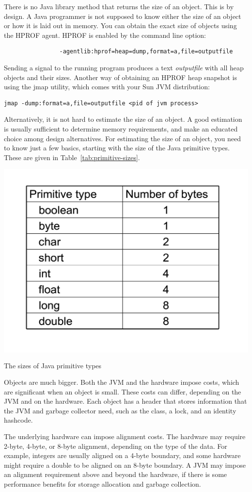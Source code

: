 \documentclass{book}
\theoremstyle{definition}
\begin{document}
There is no Java library method that returns the size of an object. This is by design. A Java programmer is not supposed to know either the size of an object or how it is laid out in memory.
You can obtain the exact size of objects using the HPROF agent. HPROF is enabled by the command line option: 
\ttfamily
\begin{verbatim} 
  				-agentlib:hprof=heap=dump,format=a,file=outputfile
\end{verbatim}
\normalfont
Sending a signal to the running program produces a text \textit{outputfile} with all heap objects and their sizes. Another way of obtaining an HPROF heap snapshot is using the jmap utility, which comes with your Sun JVM distribution:
\ttfamily
\begin{verbatim} 
jmap -dump:format=a,file=outputfile <pid of jvm process> 
\end{verbatim}
\normalfont
Alternatively, it is not hard to estimate the size of an object. A good estimation is usually sufficient to determine memory requirements, and make an educated choice among design alternatives. For estimating the size of an object, you need to know just a few basics, starting with the size of the Java primitive types. These are given in Table~\ref{tab:primitive-sizes}.
\begin{table}
  \centering
 \includegraphics[width=.40\textwidth]{Figures/chapter4/primitive-byte-sizes.pdf}
  \caption{The sizes of Java primitive types}
  \label{tab:primitive-sizes}
\end{table}

Objects are much bigger. Both the JVM and the hardware impose costs, which are significant when an object is small. These costs can differ, depending on the JVM and on the hardware. Each object has a header that stores information that the JVM and garbage collector need, such as the class, a lock, and an identity hashcode. 

The underlying hardware can impose alignment costs. The hardware may require 2-byte, 4-byte, or 8-byte alignment, depending on the type of the data. For example, integers are usually aligned on a 4-byte boundary, and some hardware might require a double to be aligned on an 8-byte boundary. A JVM may impose an alignment requirement above and beyond the hardware, if there is some performance benefits for storage allocation and garbage collection. 
\end{document}
